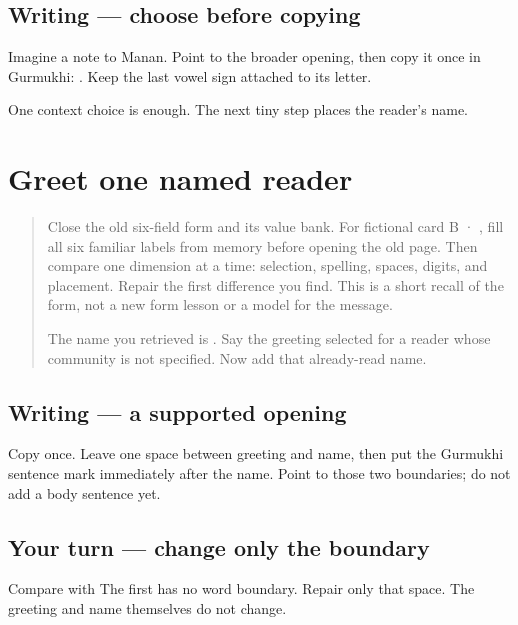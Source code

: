 \subsection*{Writing — choose before copying}
Imagine a note to Manan. Point to the broader opening, then copy it once in Gurmukhi: \textbf{}. Keep the last vowel sign attached to its letter.

\begin{tcolorbox}[breakable,colback=teal!4,colframe=teal!35!black,title={Before you move on}]
One context choice is enough. The next tiny step places the reader's name.
\end{tcolorbox}
\section[\texorpdfstring{\pa{ਨਮਸਤੇ} \pa{ਮਨਨ।} (namaste manan)}{ਨਮਸਤੇ ਮਨਨ। (namaste manan)}]{Greet one named reader}

\label{lesson:PA-W12-greeting-supported}



\begin{quote}
Close the old six-field form and its value bank. For fictional card B · , fill all six familiar labels from memory before opening the old page. Then compare one dimension at a time: selection, spelling, spaces, digits, and placement. Repair the first difference you find. This is a short recall of the form, not a new form lesson or a model for the message.

The name you retrieved is \textbf{}. Say the greeting selected for a reader whose community is not specified. Now add that already-read name.
\end{quote}

\subsection*{Writing — a supported opening}
Copy \textbf{ } once. Leave one space between greeting and name, then put the Gurmukhi sentence mark immediately after the name. Point to those two boundaries; do not add a body sentence yet.

\subsection*{Your turn — change only the boundary}
Compare \textbf{} with \textbf{ } The first has no word boundary. Repair only that space. The greeting and name themselves do not change.

